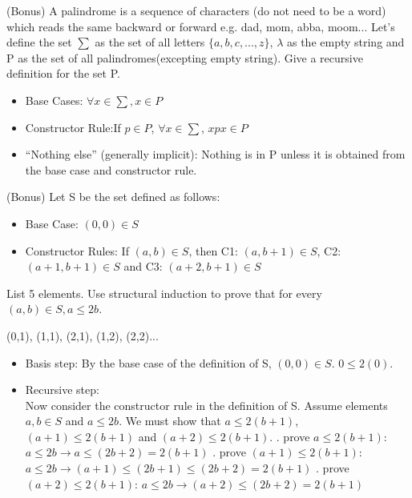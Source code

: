 \documentclass[solution, letterpaper]{cs20inclass}
\begin{document}
\problem (Bonus) A palindrome is a sequence of characters (do not need to be a word) which reads the same backward or forward e.g. dad, mom, abba, moom... Let's define the set $\sum$ as the set of all letters $\{a,b,c,...,z\}$, $\lambda$ as the empty string and P as the set of all palindromes(excepting empty string). Give a recursive definition for the set P.

\begin{solution}
\begin{itemize}
\item Base Cases: $\forall x\in \sum, x\in P$
\item Constructor Rule:If $p \in P$,  $\forall x\in \sum$, $xpx\in P$
\item “Nothing else” (generally implicit): Nothing is in P unless it is obtained from the base case and constructor rule.
\end{itemize}
\end{solution}

\problem (Bonus) Let S be the set defined as follows:
\begin{itemize}
\item Base Case: $(0,0) \in S$
\item Constructor Rules: If $(a,b)\in S$, then C1: $(a, b+1) \in S$, C2: $(a+1,b+1)\in S$ and C3: $(a+2, b+1)\in S$ 
\end{itemize}
\subproblem List 5 elements.
\subproblem Use structural induction to prove that for every $(a,b)\in S, a\leq 2b$.

\begin{solution}
\subsolution (0,1), (1,1), (2,1), (1,2), (2,2)...
\subsolution
\begin{itemize}
\item Basis step: By the base case of the definition of S, $(0,0)\in S$. $0\leq2(0)$.
\item Recursive step: \\
Now consider the constructor rule in the definition of S. Assume elements $a,b\in S$ and $ a\leq 2b$. We must  show that $a\leq2(b+1)$, $(a+1)\leq2(b+1)$ and $(a+2)\leq2(b+1)$.
. prove $a\leq2(b+1)$:  $a\leq2b\rightarrow a\leq(2b+2)=2(b+1)$
. prove $(a+1)\leq2(b+1)$: $a\leq2b \rightarrow (a+1)\leq(2b+1)\leq(2b+2)=2(b+1)$
. prove $(a+2)\leq2(b+1)$:  $a\leq2b \rightarrow (a+2)\leq(2b+2)=2(b+1)$
\end{itemize}
\end{solution}
\end{document}
